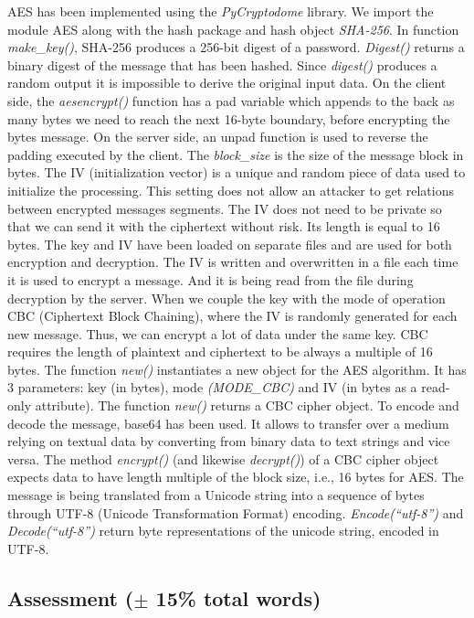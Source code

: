 AES has been implemented using the \textit{PyCryptodome} library. We import the module AES along with the hash package and hash object \textit{SHA-256}. In function \textit{make\_key()}, SHA-256 produces a 256-bit digest of a password. \textit{Digest()} returns a binary digest of the message that has been hashed. Since \textit{digest()} produces a random output it is impossible to derive the original input data. On the client side, the \textit{aesencrypt()} function has a pad variable which appends to the back as many bytes we need to reach the next 16-byte boundary, before encrypting the bytes message. On the server side, an unpad function is used to reverse the padding executed by the client. The \textit{block\_size} is the size of the message block in bytes. The IV (initialization vector) is a unique and random piece of data used to initialize the processing. This setting does not allow an attacker to get relations between encrypted messages segments. The IV does not need to be private so that we can send it with the ciphertext without risk. Its length is equal to 16 bytes. The key and IV have been loaded on separate files and are used for both encryption and decryption. The IV is written and overwritten in a file each time it is used to encrypt a message. And it is being read from the file during decryption by the server. When we couple the key with the mode of operation CBC (Ciphertext Block Chaining), where the IV is randomly generated for each new message. Thus, we can encrypt a lot of data under the same key. CBC requires the length of plaintext and ciphertext to be always a multiple of 16 bytes. The function \textit{new()} instantiates a new object for the AES algorithm. It has 3 parameters: key (in bytes), mode \textit{(MODE\_CBC)} and IV (in bytes as a read-only attribute). The function \textit{new()} returns a CBC cipher object. To encode and decode the message, base64 has been used. It allows to transfer over a medium relying on textual data by converting from binary data to text strings and vice versa. The method \textit{encrypt()} (and likewise \textit{decrypt()}) of a CBC cipher object expects data to have length multiple of the block size, i.e., 16 bytes for AES. The message is being translated from a Unicode string into a sequence of bytes through UTF-8 (Unicode Transformation Format) encoding. \textit{Encode(“utf-8”)} and \textit{Decode(“utf-8”)} return byte representations of the unicode string, encoded in UTF-8.

\subsection{Assessment ($\pm$ 15\% total words)}

